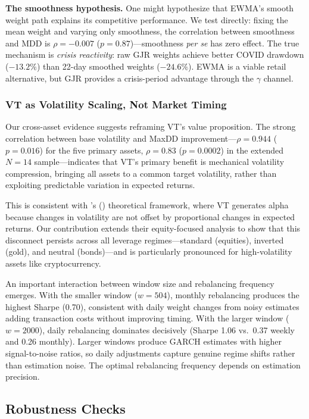 \textbf{The smoothness hypothesis.} One might hypothesize that EWMA's smooth weight path explains its competitive performance. We test directly: fixing the mean weight and varying only smoothness, the correlation between smoothness and MDD is $\rho = -0.007$ ($p = 0.87$)---smoothness \textit{per se} has zero effect. The true mechanism is \textit{crisis reactivity}: raw GJR weights achieve better COVID drawdown ($-13.2\%$) than 22-day smoothed weights ($-24.6\%$). EWMA is a viable retail alternative, but GJR provides a crisis-period advantage through the $\gamma$ channel.

\subsubsection{VT as Volatility Scaling, Not Market Timing}

Our cross-asset evidence suggests reframing VT's value proposition. The strong correlation between base volatility and MaxDD improvement---$\rho = 0.944$ ($p = 0.016$) for the five primary assets, $\rho = 0.83$ ($p = 0.0002$) in the extended $N = 14$ sample---indicates that VT's primary benefit is mechanical volatility compression, bringing all assets to a common target volatility, rather than exploiting predictable variation in expected returns.

This is consistent with \citeauthor{moreira2017}'s (\citeyear{moreira2017}) theoretical framework, where VT generates alpha because changes in volatility are not offset by proportional changes in expected returns. Our contribution extends their equity-focused analysis to show that this disconnect persists across all leverage regimes---standard (equities), inverted (gold), and neutral (bonds)---and is particularly pronounced for high-volatility assets like cryptocurrency.

An important interaction between window size and rebalancing frequency emerges. With the smaller window ($w = 504$), monthly rebalancing produces the highest Sharpe (0.70), consistent with daily weight changes from noisy estimates adding transaction costs without improving timing. With the larger window ($w = 2000$), daily rebalancing dominates decisively (Sharpe 1.06 vs.\ 0.37 weekly and 0.26 monthly). Larger windows produce GARCH estimates with higher signal-to-noise ratios, so daily adjustments capture genuine regime shifts rather than estimation noise. The optimal rebalancing frequency depends on estimation precision.


\subsection{Robustness Checks}
\label{sec:robustness_checks}

